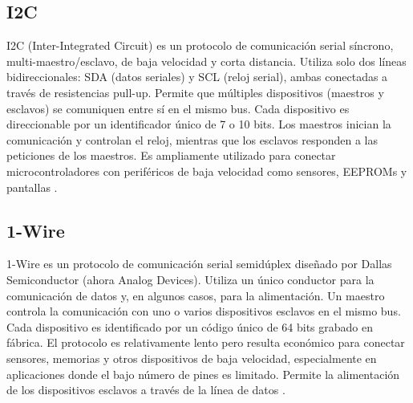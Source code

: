 \subsection{I2C}
I2C (Inter-Integrated Circuit) es un protocolo de comunicación serial síncrono, multi-maestro/esclavo, de baja velocidad y corta distancia. Utiliza solo dos líneas bidireccionales: SDA (datos seriales) y SCL (reloj serial), ambas conectadas a través de resistencias pull-up. Permite que múltiples dispositivos (maestros y esclavos) se comuniquen entre sí en el mismo bus. Cada dispositivo es direccionable por un identificador único de 7 o 10 bits. Los maestros inician la comunicación y controlan el reloj, mientras que los esclavos responden a las peticiones de los maestros. Es ampliamente utilizado para conectar microcontroladores con periféricos de baja velocidad como sensores, EEPROMs y pantallas \cite{I2C}.

\subsection{1-Wire}
1-Wire es un protocolo de comunicación serial semidúplex diseñado por Dallas Semiconductor (ahora Analog Devices). Utiliza un único conductor para la comunicación de datos y, en algunos casos, para la alimentación. Un maestro controla la comunicación con uno o varios dispositivos esclavos en el mismo bus. Cada dispositivo es identificado por un código único de 64 bits grabado en fábrica. El protocolo es relativamente lento pero resulta económico para conectar sensores, memorias y otros dispositivos de baja velocidad, especialmente en aplicaciones donde el bajo número de pines es limitado. Permite la alimentación de los dispositivos esclavos a través de la línea de datos \cite{1WIRE}.










